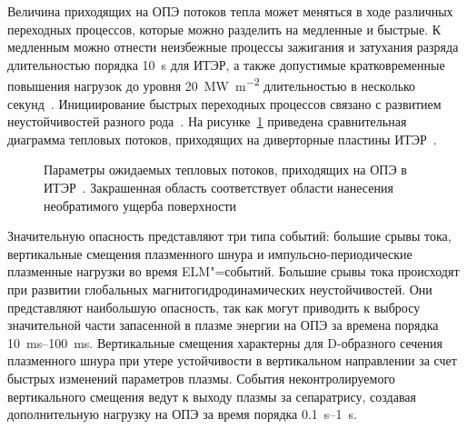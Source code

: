 Величина приходящих на ОПЭ потоков тепла может меняться в ходе различных переходных процессов, которые можно разделить на медленные и быстрые. К медленным можно отнести неизбежные процессы зажигания и затухания разряда длительностью порядка \SI{10}{\second} для ИТЭР, а также допустимые кратковременные повышения нагрузок до уровня \SI{20}{\mega\watt\per\meter\squared} длительностью в несколько секунд~\cite{Pitts2017}. Инициирование быстрых переходных процессов связано с развитием неустойчивостей разного рода~\cite{hender2007mhd}. На рисунке~\cref{fig:ch1/Heat_loads_diagram} приведена сравнительная диаграмма тепловых потоков, приходящих на диверторные пластины ИТЭР~\cite{Linke2019}.

\begin{figure}[ht]
    \caption{Параметры ожидаемых тепловых потоков, приходящих на ОПЭ в ИТЭР~\cite{Linke2019}. Закрашенная область соответствует области нанесения необратимого ущерба поверхности}\label{fig:ch1/Heat_loads_diagram}
\end{figure}

Значительную опасность представляют три типа событий: большие срывы тока, вертикальные смещения плазменного шнура и импульсно-периодические плазменные нагрузки во время ELM"=событий. Большие срывы тока происходят при развитии глобальных магнитогидродинамических неустойчивостей. Они представляют наибольшую опасность, так как могут приводить к выбросу значительной части запасенной в плазме энергии на ОПЭ за времена порядка \SIrange{10}{100}{\milli\second}. Вертикальные смещения характерны для D-образного сечения плазменного шнура при утере устойчивости в вертикальном направлении за счет быстрых изменений параметров плазмы. События неконтролируемого вертикального смещения ведут к выходу плазмы за сепаратрису, создавая дополнительную нагрузку на ОПЭ за время порядка \SIrange{0.1}{1}{\second}. 

